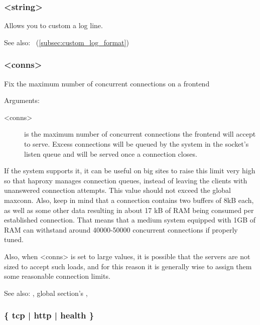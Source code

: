 \subsubsection[log-format]{ <string>}

   Allows you to custom a log line.

   See also:~ (\ref{subsec:custom_log_format})

\subsubsection[maxconn]{ <conns>}

  Fix the maximum number of concurrent connections on a frontend


  Arguments:
\begin{description}
\item[<conns>]
              is the maximum number of concurrent connections the frontend will
              accept to serve. Excess connections will be queued by the system
              in the socket's listen queue and will be served once a connection
              closes.

\end{description}

  If the system supports it, it can be useful on big sites to raise this limit
  very high so that haproxy manages connection queues, instead of leaving the
  clients with unanswered connection attempts. This value should not exceed the
  global maxconn. Also, keep in mind that a connection contains two buffers
  of 8kB each, as well as some other data resulting in about 17 kB of RAM being
  consumed per established connection. That means that a medium system equipped
  with 1GB of RAM can withstand around 40000-50000 concurrent connections if
  properly tuned.

  Also, when <conns> is set to large values, it is possible that the servers
  are not sized to accept such loads, and for this reason it is generally wise
  to assign them some reasonable connection limits.

  See also: , global section's , 

\subsubsection[mode]{ \{ tcp | http | health \}}

